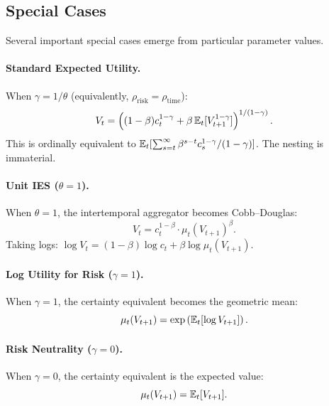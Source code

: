 \subsection{Special Cases}
\label{subsec:ez-special-cases}

Several important special cases emerge from particular parameter values.

\paragraph{Standard Expected Utility.}
When $\gamma = 1/\theta$ (equivalently, $\rho_{\text{risk}} = \rho_{\text{time}}$):
\begin{equation}
V_t = \left( (1-\beta) c_t^{1-\gamma} + \beta \, \mathbb{E}_t[V_{t+1}^{1-\gamma}] \right)^{1/(1-\gamma)}.
\label{eq:ez-standard}
\end{equation}
This is ordinally equivalent to $\mathbb{E}_t[\sum_{s=t}^{\infty} \beta^{s-t} c_s^{1-\gamma}/(1-\gamma)]$. The nesting is immaterial.

\paragraph{Unit IES ($\theta = 1$).}
When $\theta = 1$, the intertemporal aggregator becomes Cobb--Douglas:
\begin{equation}
V_t = c_t^{1-\beta} \cdot \mu_t(V_{t+1})^\beta.
\label{eq:ez-unit-ies}
\end{equation}
Taking logs: $\log V_t = (1-\beta) \log c_t + \beta \log \mu_t(V_{t+1})$.

\paragraph{Log Utility for Risk ($\gamma = 1$).}
When $\gamma = 1$, the certainty equivalent becomes the geometric mean:
\begin{equation}
\mu_t(V_{t+1}) = \exp\left( \mathbb{E}_t[\log V_{t+1}] \right).
\label{eq:ez-log-risk}
\end{equation}

\paragraph{Risk Neutrality ($\gamma = 0$).}
When $\gamma = 0$, the certainty equivalent is the expected value:
\begin{equation}
\mu_t(V_{t+1}) = \mathbb{E}_t[V_{t+1}].
\label{eq:ez-risk-neutral}
\end{equation}

